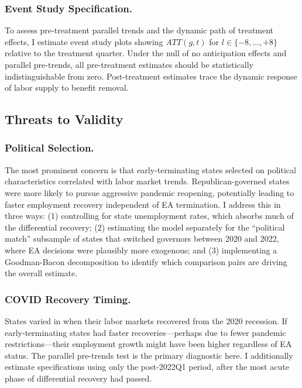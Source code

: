 \documentclass[12pt]{article}
\begin{document}
\subsubsection*{Event Study Specification.} To assess pre-treatment parallel trends and the dynamic path of treatment effects, I estimate event study plots showing $ATT(g, t)$ for $l \in \{-8, \ldots, +8\}$ relative to the treatment quarter. Under the null of no anticipation effects and parallel pre-trends, all pre-treatment estimates should be statistically indistinguishable from zero. Post-treatment estimates trace the dynamic response of labor supply to benefit removal.

\subsection{Threats to Validity}

\subsubsection*{Political Selection.} The most prominent concern is that early-terminating states selected on political characteristics correlated with labor market trends. Republican-governed states were more likely to pursue aggressive pandemic reopening, potentially leading to faster employment recovery independent of EA termination. I address this in three ways: (1) controlling for state unemployment rates, which absorbs much of the differential recovery; (2) estimating the model separately for the ``political match'' subsample of states that switched governors between 2020 and 2022, where EA decisions were plausibly more exogenous; and (3) implementing a Goodman-Bacon \citep{goodmanbacon2021difference} decomposition to identify which comparison pairs are driving the overall estimate.

\subsubsection*{COVID Recovery Timing.} States varied in when their labor markets recovered from the 2020 recession. If early-terminating states had faster recoveries---perhaps due to fewer pandemic restrictions---their employment growth might have been higher regardless of EA status. The parallel pre-trends test is the primary diagnostic here. I additionally estimate specifications using only the post-2022Q1 period, after the most acute phase of differential recovery had passed.
\end{document}
